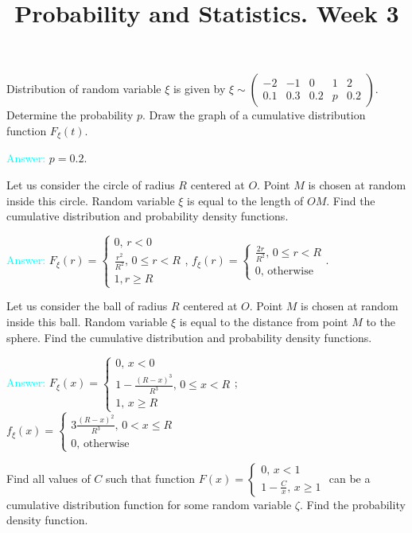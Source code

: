 \documentclass[14pt]{exam}
\title{Probability and Statistics. Week 3}
\date{}
\begin{document}
	\maketitle
	
	
	\begin{questions}
		\question
		Distribution of random variable $\xi$ is given by $\xi \sim \begin{pmatrix}
			-2 & -1 & 0 & 1 & 2\\
			0.1 & 0.3 & 0.2 & p & 0.2
		\end{pmatrix}$. Determine the probability $p$. Draw the graph of a cumulative distribution function $F_\xi(t)$.
		
		\textcolor{cyan}{Answer:} $p = 0.2$.
		
		\question
		Let us consider the circle of radius $R$ centered at $O$. Point $M$ is chosen at random inside this circle. Random variable $\xi$ is equal to the length of $OM$. Find the cumulative distribution and probability density functions.
		
		\textcolor{cyan}{Answer:} $F_\xi(r) = \begin{cases}
			0,\, r < 0\\
			\frac{r^2}{R^2},\, 0 \leq r < R\\
			1, r \geq R\end{cases}$, $f_\xi(r) = \begin{cases}\frac{2r}{R^2},\, 0 \leq r < R\\ 0,\, \text{otherwise}\end{cases}$.
		
		\question
		Let us consider the ball of radius $R$ centered at $O$. Point $M$ is chosen at random inside this ball. Random variable $\xi$ is equal to the distance from point $M$ to the sphere. Find the cumulative distribution and probability density functions.
		
		\textcolor{cyan}{Answer:} $F_\xi(x) = \begin{cases}
			0, \, x < 0\\
			1 - \frac{(R-x)^3}{R^3},\, 0 \leq x < R\\
			1,\, x \geq R
		\end{cases}$; $f_\xi(x) = \begin{cases}
		3\frac{(R - x)^2}{R^3},\, 0 < x \leq R\\
		0,\, \text{otherwise}
		\end{cases}$
		
		\question
		Find all values of $C$ such that function $F(x) = \begin{cases}
			0,\, x < 1\\
			1 - \frac{C}{x},\, x \geq 1
		\end{cases}$ can be a cumulative distribution function for some random variable $\zeta$. Find the probability density function.
		

\end{questions}
\end{document}
